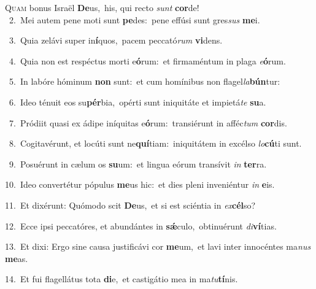 \lettrine{\initial\textcolor{\initialcolor}{Q}}{uam} bonus Israël \textbf{De}\-us,~\star his, qui recto \textit{sunt} \textbf{cor}\-de!\\
{\numbfont\textcolor{\numbcolor}{~2.}}~Mei autem pene moti sunt \textbf{pe}\-des:~\star pene effúsi sunt gres\textit{sus} \textbf{me}\-i.\par
{\numbfont\textcolor{\numbcolor}{~3.}}~Quia zelávi super in\-\textbf{í}\-quos,~\star pacem peccató\textit{rum} \textbf{vi}\-dens.\par
{\numbfont\textcolor{\numbcolor}{~4.}}~Quia non est respéctus morti e\-\textbf{ó}\-rum:~\star et firmaméntum in plaga \textit{e}\-\textbf{ó}rum.\par
{\numbfont\textcolor{\numbcolor}{~5.}}~In labóre hóminum \textbf{non} sunt:~\star et cum homínibus non flagel\-\textit{la}\-\textbf{bún}tur:\par
{\numbfont\textcolor{\numbcolor}{~6.}}~Ideo ténuit eos su\-\textbf{pér}\-bia,~\star opérti sunt iniquitáte et impietá\textit{te} \textbf{su}\-a.\par
{\numbfont\textcolor{\numbcolor}{~7.}}~Pródiit quasi ex ádipe iníquitas e\-\textbf{ó}\-rum:~\star transiérunt in afféc\textit{tum} \textbf{cor}\-dis.\par
{\numbfont\textcolor{\numbcolor}{~8.}}~Cogitavérunt, et locúti sunt ne\-\textbf{quí}\-tiam:~\star iniquitátem in excélso \textit{lo}\-\textbf{cú}ti sunt.\par
{\numbfont\textcolor{\numbcolor}{~9.}}~Posuérunt in cælum os \textbf{su}\-um:~\star et lingua eórum transívit \textit{in} \textbf{ter}\-ra.\par
{\numbfont\textcolor{\numbcolor}{10.}}~Ideo convertétur pópulus \textbf{me}\-us hic:~\star et dies pleni inveniéntur \textit{in} \textbf{e}\-is.\par
{\numbfont\textcolor{\numbcolor}{11.}}~Et dixérunt: Quómodo scit \textbf{De}\-us,~\star et si est sciéntia in \textit{ex}\-\textbf{cél}so?\par
{\numbfont\textcolor{\numbcolor}{12.}}~Ecce ipsi peccatóres, et abundántes in \textbf{sǽ}\-culo,~\star obtinuérunt \textit{di}\-\textbf{ví}tias.\par
{\numbfont\textcolor{\numbcolor}{13.}}~Et dixi: Ergo sine causa justificávi cor \textbf{me}\-um,~\star et lavi inter innocéntes ma\textit{nus} \textbf{me}\-as.\par
{\numbfont\textcolor{\numbcolor}{14.}}~Et fui flagellátus tota \textbf{di}\-e,~\star et castigátio mea in ma\-\textit{tu}\-\textbf{tí}nis.\par
